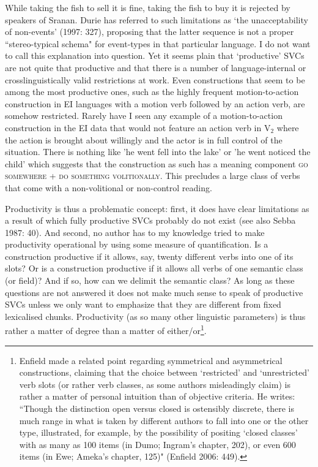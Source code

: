 While taking the fish to sell it is fine, taking the fish to buy it is rejected by speakers of Sranan. Durie has referred to such limitations as `the unacceptability of non-events' (1997: 327), proposing that the latter sequence is not a proper ``stereo-typical schema" for event-types in that particular language. I do not want to call this explanation into question. Yet it seems plain that `productive' SVCs are not quite that productive and that there is a number of language-internal or crosslinguistically valid restrictions at work. Even constructions that seem to be among the most productive ones, such as the highly frequent motion-to-action construction in EI languages with a motion verb followed by an action verb, are somehow restricted. Rarely have I seen any example of a motion-to-action construction in the EI data that would not feature an action verb in V$_2$ where the action is brought about willingly and the actor is in full control of the situation. There is nothing like 'he went fell into the lake' or 'he went noticed the child' which suggests that the construction as such has a meaning component \textsc{go somewhere + do something volitionally}. This precludes a large class of verbs that come with a non-volitional or non-control reading.

Productivity is thus a problematic concept: first, it does have clear limitations as a result of which fully productive SVCs probably do not exist (see also Sebba 1987: 40). And second, no author has to my knowledge tried to make productivity operational by using some measure of quantification. Is a construction productive if it allows, say, twenty different verbs into one of its slots? Or is a construction productive if it allows all verbs of one semantic class (or field)? And if so, how can we delimit the semantic class? As long as these questions are not answered it does not make much sense to speak of productive SVCs unless we only want to emphasize that they are different from fixed lexicalised chunks. Productivity (as so many other linguistic parameters) is thus rather a matter of degree than a matter of either/or\footnote{Enfield made a related point regarding symmetrical and asymmetrical constructions, claiming that the choice between `restricted' and `unrestricted' verb slots (or rather verb classes, as some authors misleadingly claim) is rather a matter of personal intuition than of objective criteria. He writes: ``Though the distinction open versus closed is ostensibly discrete, there is much range in what is taken by different authors to fall into one or the other type, illustrated, for example, by the possibility of positing `closed classes’ with as many as 100 items (in Dumo; Ingram’s chapter, 202), or even 600 items (in Ewe; Ameka’s chapter, 125)" (Enfield 2006: 449).}.

